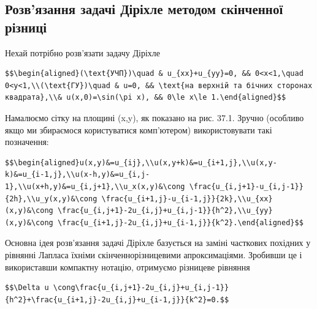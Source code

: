 \documentclass[
  ukrainian,
]{article}
\begin{document}
\subsection{Розв'язання задачі Діріхле методом скінченної
різниці}\label{ux440ux43eux437ux432ux44fux437ux430ux43dux43dux44f-ux437ux430ux434ux430ux447ux456-ux434ux456ux440ux456ux445ux43bux435-ux43cux435ux442ux43eux434ux43eux43c-ux441ux43aux456ux43dux447ux435ux43dux43dux43eux457-ux440ux456ux437ux43dux438ux446ux456}

Нехай потрібно розв'язати задачу Діріхле

\begin{verbatim}
$$\begin{aligned}(\text{УЧП})\quad & u_{xx}+u_{yy}=0, && 0<x<1,\quad 0<y<1,\\(\text{ГУ})\quad & u=0, && \text{на верхній та бічних сторонах квадрата},\\& u(x,0)=\sin(\pi x), && 0\le x\le 1.\end{aligned}$$
\end{verbatim}

Намалюємо сітку на площині (x,y), як показано на рис. 37.1. Зручно
(особливо якщо ми збираємося користуватися комп'ютером) використовувати
такі позначення:

\begin{verbatim}
$$\begin{aligned}u(x,y)&=u_{ij},\\u(x,y+k)&=u_{i+1,j},\\u(x,y-k)&=u_{i-1,j},\\u(x-h,y)&=u_{i,j-1},\\u(x+h,y)&=u_{i,j+1},\\u_x(x,y)&\cong \frac{u_{i,j+1}-u_{i,j-1}}{2h},\\u_y(x,y)&\cong \frac{u_{i+1,j}-u_{i-1,j}}{2k},\\u_{xx}(x,y)&\cong \frac{u_{i,j+1}-2u_{i,j}+u_{i,j-1}}{h^2},\\u_{yy}(x,y)&\cong \frac{u_{i+1,j}-2u_{i,j}+u_{i-1,j}}{k^2}.\end{aligned}$$
\end{verbatim}

Основна ідея розв'язання задачі Діріхле базується на заміні часткових
похідних у рівнянні Лапласа їхніми скінченнорізницевими апроксимаціями.
Зробивши це і використавши компактну нотацію, отримуємо різницеве
рівняння

\begin{verbatim}
$$\Delta u \cong\frac{u_{i,j+1}-2u_{i,j}+u_{i,j-1}}{h^2}+\frac{u_{i+1,j}-2u_{i,j}+u_{i-1,j}}{k^2}=0.$$
\end{verbatim}
\end{document}
